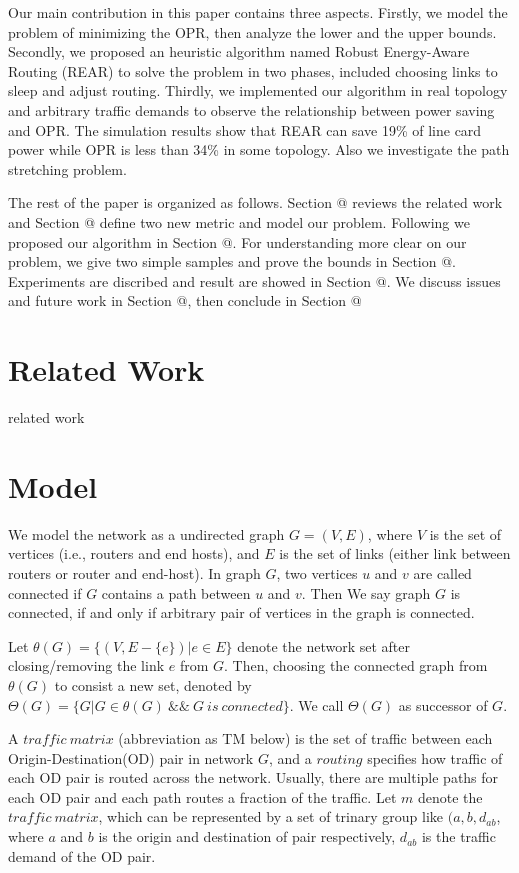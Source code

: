 \documentclass[conference]{IEEEtran}
\makeatletter
\newcommand{\Rmnum}[1]{\expandafter\@slowromancap\romannumeral #1@}
\makeatother
\begin{document}
Our main contribution in this paper contains three aspects. Firstly, we model the problem of minimizing the OPR, then
analyze the lower and the upper bounds. Secondly, we proposed an heuristic algorithm named Robust Energy-Aware Routing (REAR) 
to solve the problem in two phases, included choosing links to sleep and adjust routing. Thirdly, we implemented our
algorithm in real topology and arbitrary traffic demands to observe the relationship between power saving and OPR. The
simulation results show that REAR can save 19\% of line card power while OPR is less than 34\% in some topology. Also 
we investigate the path stretching problem.


The rest of the paper is organized as follows. Section \Rmnum{2} reviews the related work and Section \Rmnum{3}
define two new metric and model our problem. Following we proposed our algorithm in Section \Rmnum{4}. For understanding
more clear on our problem, we give two simple samples and prove the bounds in Section \Rmnum{5}. Experiments are discribed
and result are showed in Section \Rmnum{6}. We discuss issues and future work in Section \Rmnum{7}, then conclude in 
Section \Rmnum{8}

\section{Related Work}
related work


\section{Model}
We model the network as a undirected graph $G = (V, E)$, where $V$ is the set of vertices (i.e., routers and end hosts), 
and $E$ is the set of links (either link between routers or router and end-host). In graph $G$, two vertices $u$ and $v$
are called connected if $G$ contains a path between $u$ and $v$. Then We say graph $G$ is connected, if and only if 
arbitrary pair of vertices in the graph is connected.

Let $\theta(G) = \{ (V, E - \{ e \}) | e \in E \}$ denote the network set after closing/removing the link $e$ from
$G$. Then, choosing the connected graph from $\theta(G)$ to consist a new set, denoted by 
$\Theta(G) = \{G | G \in \theta(G) \ \& \& \ G\ is\ connected\}$. We call $\Theta(G)$ as successor of $G$.

A $traffic\ matrix$ (abbreviation as TM below) is the set of traffic between each Origin-Destination(OD) pair in 
network $G$, and a $routing$ specifies how traffic of each OD pair is routed across the network. Usually, there are 
multiple paths for each OD pair and each path routes a fraction of the traffic. Let $m$ denote the $traffic\ matrix$, 
which can be represented by a set of trinary group like $(a, b, d_{ab}$, where $a$ and $b$ is the origin and 
destination of pair respectively, $d_{ab}$ is the traffic demand of the OD pair. 
\end{document}
